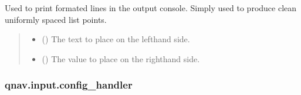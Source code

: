 \documentclass[letterpaper,10pt,english]{sphinxmanual}
\begin{document}

\begin{fulllineitems}
\label{\detokenize{modules/input/config:qnav.input.config.print_line}}
\pysigstartsignatures
{}
\pysigstopsignatures
\sphinxAtStartPar
Used to print formated lines in the output console.
Simply used to produce clean uniformly spaced list points.
\begin{quote}\begin{description}
\begin{itemize}
\item {} 
\sphinxAtStartPar
{} () \textendash{} The text to place on the left\sphinxhyphen{}hand side.

\item {} 
\sphinxAtStartPar
{} () \textendash{} The value to place on the right\sphinxhyphen{}hand side.

\end{itemize}

\end{description}\end{quote}

\end{fulllineitems}


\sphinxstepscope


\subsubsection{qnav.input.config\_handler}
\label{\detokenize{modules/input/config_handler:module-qnav.input.config_handler}}\label{\detokenize{modules/input/config_handler:qnav-input-config-handler}}\label{\detokenize{modules/input/config_handler::doc}}
\end{document}
